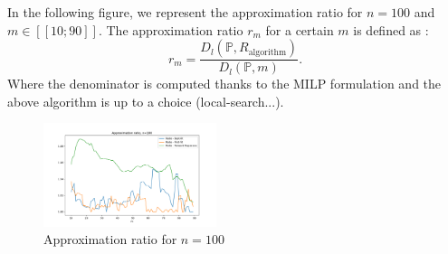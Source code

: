 \documentclass{amsart}
\begin{document}
In the following figure, we represent the approximation ratio for $n=100$ and $m\in [\![10;90]\!]$. The approximation ratio $r_m$ for a certain $m$ is defined as : 
$$
r_m = \frac{D_l\left(\mathbb{P},R_{\text{algorithm}}\right)}{D_l\left(\mathbb{P},m\right)}.
$$
Where the denominator is computed thanks to the MILP formulation and the above algorithm is up to a choice (local-search...).

\begin{figure}[ht]
    \centering
    \includegraphics[width=0.45\textwidth]{plots/ratio with milp.pdf}
    \caption{Approximation ratio for $n=100$}
\end{figure}
    
\end{document}
